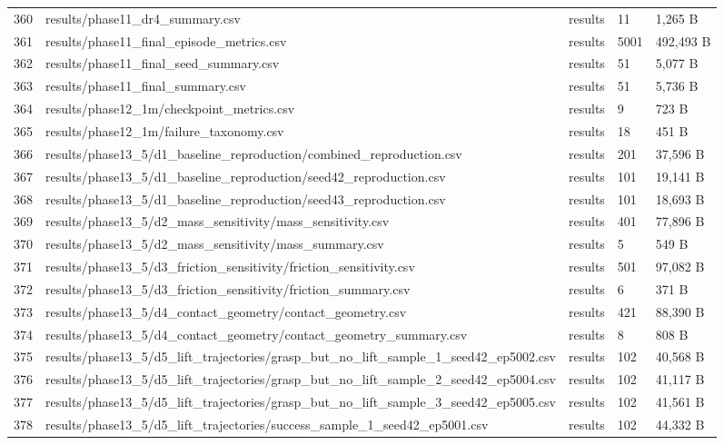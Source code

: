 \documentclass[11pt,a4paper,oneside]{book}
\begin{document}
\begin{longtable}{l l l l l}
360 & results/phase11\_dr4\_summary.csv & results & 11 & 1,265 B \\
361 & results/phase11\_final\_episode\_metrics.csv & results & 5001 & 492,493 B \\
362 & results/phase11\_final\_seed\_summary.csv & results & 51 & 5,077 B \\
363 & results/phase11\_final\_summary.csv & results & 51 & 5,736 B \\
364 & results/phase12\_1m/checkpoint\_metrics.csv & results & 9 & 723 B \\
365 & results/phase12\_1m/failure\_taxonomy.csv & results & 18 & 451 B \\
366 & results/phase13\_5/d1\_baseline\_reproduction/combined\_reproduction.csv & results & 201 & 37,596 B \\
367 & results/phase13\_5/d1\_baseline\_reproduction/seed42\_reproduction.csv & results & 101 & 19,141 B \\
368 & results/phase13\_5/d1\_baseline\_reproduction/seed43\_reproduction.csv & results & 101 & 18,693 B \\
369 & results/phase13\_5/d2\_mass\_sensitivity/mass\_sensitivity.csv & results & 401 & 77,896 B \\
370 & results/phase13\_5/d2\_mass\_sensitivity/mass\_summary.csv & results & 5 & 549 B \\
371 & results/phase13\_5/d3\_friction\_sensitivity/friction\_sensitivity.csv & results & 501 & 97,082 B \\
372 & results/phase13\_5/d3\_friction\_sensitivity/friction\_summary.csv & results & 6 & 371 B \\
373 & results/phase13\_5/d4\_contact\_geometry/contact\_geometry.csv & results & 421 & 88,390 B \\
374 & results/phase13\_5/d4\_contact\_geometry/contact\_geometry\_summary.csv & results & 8 & 808 B \\
375 & results/phase13\_5/d5\_lift\_trajectories/grasp\_but\_no\_lift\_sample\_1\_seed42\_ep5002.csv & results & 102 & 40,568 B \\
376 & results/phase13\_5/d5\_lift\_trajectories/grasp\_but\_no\_lift\_sample\_2\_seed42\_ep5004.csv & results & 102 & 41,117 B \\
377 & results/phase13\_5/d5\_lift\_trajectories/grasp\_but\_no\_lift\_sample\_3\_seed42\_ep5005.csv & results & 102 & 41,561 B \\
378 & results/phase13\_5/d5\_lift\_trajectories/success\_sample\_1\_seed42\_ep5001.csv & results & 102 & 44,332 B \\

\end{longtable}
\end{document}
